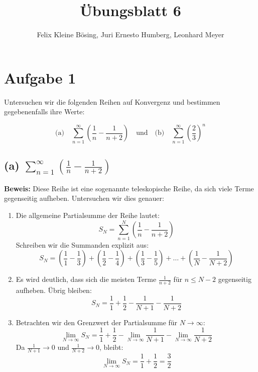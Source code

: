 \documentclass[11pt]{article}
\begin{document}
\title{Übungsblatt 6}
\author{Felix Kleine Bösing, Juri Ernesto Humberg, Leonhard Meyer}
\maketitle
\newpage

\section*{Aufgabe 1}

Untersuchen wir die folgenden Reihen auf Konvergenz und bestimmen gegebenenfalls ihre Werte:

\[
\text{(a)} \quad \sum_{n=1}^\infty \left( \frac{1}{n} - \frac{1}{n+2} \right) \quad \text{und} \quad
\text{(b)} \quad \sum_{n=1}^\infty \left( \frac{2}{3} \right)^n
\]

\subsection*{(a) \(\sum_{n=1}^\infty \left( \frac{1}{n} - \frac{1}{n+2} \right)\)}

\textbf{Beweis:}
Diese Reihe ist eine sogenannte teleskopische Reihe, da sich viele Terme gegenseitig aufheben. Untersuchen wir dies genauer:

\begin{enumerate}
    \item Die allgemeine Partialsumme der Reihe lautet:
    \[
    S_N = \sum_{n=1}^N \left( \frac{1}{n} - \frac{1}{n+2} \right)
    \]
    Schreiben wir die Summanden explizit aus:
    \[
    S_N = \left( \frac{1}{1} - \frac{1}{3} \right) + \left( \frac{1}{2} - \frac{1}{4} \right) + \left( \frac{1}{3} - \frac{1}{5} \right) + \dots + \left( \frac{1}{N} - \frac{1}{N+2} \right)
    \]

    \item Es wird deutlich, dass sich die meisten Terme \(\frac{1}{n+2}\) für \(n \leq N-2\) gegenseitig aufheben. Übrig bleiben:
    \[
    S_N = \frac{1}{1} + \frac{1}{2} - \frac{1}{N+1} - \frac{1}{N+2}
    \]

    \item Betrachten wir den Grenzwert der Partialsumme für \(N \to \infty\):
    \[
    \lim_{N \to \infty} S_N = \frac{1}{1} + \frac{1}{2} - \lim_{N \to \infty} \frac{1}{N+1} - \lim_{N \to \infty} \frac{1}{N+2}
    \]
    Da \(\frac{1}{N+1} \to 0\) und \(\frac{1}{N+2} \to 0\), bleibt:
    \[
    \lim_{N \to \infty} S_N = \frac{1}{1} + \frac{1}{2} = \frac{3}{2}
    \]
\end{enumerate}
\end{document}
